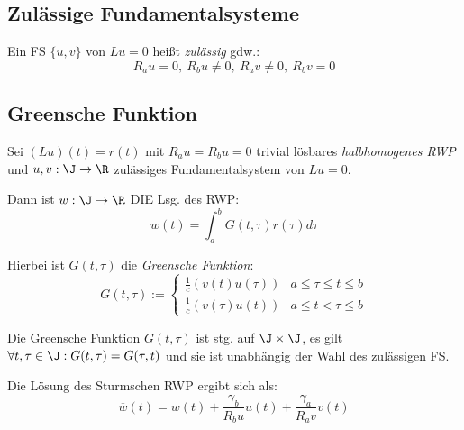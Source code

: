 \subsection*{Zulässige Fundamentalsysteme}

Ein FS \(\{u,v\}\) von \(Lu=0\) heißt \emph{zulässig} gdw.: \[R_a u = 0, \ R_b u \neq 0, \ R_a v \neq 0, \ R_b v = 0\]

\subsection*{Greensche Funktion}

Sei \((Lu)(t)=r(t)\) mit \(R_a u = R_b u = 0\) trivial lösbares \emph{halbhomogenes RWP} und \(u, v : \J \to \R\) zulässiges Fundamentalsystem von \(Lu=0\).

Dann ist \(w : \J \to \R\) DIE Lsg. des RWP: \[w(t)=\int_a^b G(t,\tau)r(\tau) d\tau\]

Hierbei ist \(G(t,\tau)\) die \emph{Greensche Funktion}:
\[G(t,\tau) := \begin{cases}
	\frac{1}{c}(v(t)u(\tau)) & a \leq \tau \leq t \leq b \\
	\frac{1}{c}(v(\tau)u(t)) & a \leq t < \tau \leq b
\end{cases}\]

Die Greensche Funktion \(G(t,\tau)\) ist stg. auf \(\J \times \J\), es gilt \(\forall t, \tau \in \J : G(t,\tau)=G(\tau,t)\) und sie ist unabhängig der Wahl des zulässigen FS.

Die Lösung des Sturmschen RWP ergibt sich als: \[\overline w(t) = w(t) + \frac{\gamma_b}{R_b u} u(t) + \frac{\gamma_a}{R_a v} v(t)\]